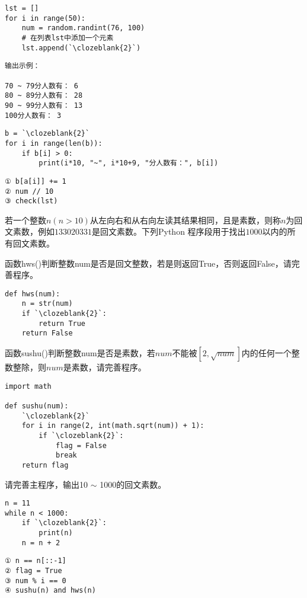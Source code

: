 \begin{groups}
\begin{questions}[rp]
\begin{subquestions}
\begin{paracol}{2}
\begin{lstlisting}
lst = []
for i in range(50):
    num = random.randint(76, 100)
    # 在列表lst中添加一个元素
    lst.append(`\clozeblank{2}`)  
\end{lstlisting}
\switchcolumn
\begin{lstlisting}[frame=single]
输出示例：

70 ~ 79分人数有： 6
80 ~ 89分人数有： 28
90 ~ 99分人数有： 13
100分人数有： 3
\end{lstlisting}
\end{paracol}
\begin{lstlisting}
b = `\clozeblank{2}`
for i in range(len(b)):
    if b[i] > 0:
        print(i*10, "~", i*10+9, "分人数有：", b[i])
\end{lstlisting}

\end{subquestions}


\begin{solution}
\begin{lstlisting}
① b[a[i]] += 1
② num // 10
③ check(lst)
\end{lstlisting}
\end{solution}



\setcounter{qnumber}{1}
\question 若一个整数$n(n>10)$从左向右和从右向左读其结果相同，且是素数，则称$n$为回文素数，例如$133020331$是回文素数。下列Python 程序段用于找出$1000$以内的所
有回文素数。
\begin{subquestions}
\subquestion 函数hws()判断整数num是否是回文整数，若是则返回True，否则返回False，请完善程序。
\begin{lstlisting}
def hws(num):
    n = str(num)
    if `\clozeblank{2}`:
        return True
    return False 
\end{lstlisting}

\subquestion 函数sushu()判断整数num是否是素数，若$num$不能被$[2, \sqrt{num}]$内的任何一个整数整除，则$num$是素数，请完善程序。
\begin{lstlisting}
import math

def sushu(num):
    `\clozeblank{2}`
    for i in range(2, int(math.sqrt(num)) + 1):
        if `\clozeblank{2}`:
            flag = False
            break
    return flag  
\end{lstlisting}

\subquestion 请完善主程序，输出10 $\sim$ 1000的回文素数。
\begin{lstlisting}
n = 11
while n < 1000:
    if `\clozeblank{2}`:
        print(n)
    n = n + 2
\end{lstlisting}
\end{subquestions}


\begin{solution}
\begin{lstlisting}
① n == n[::-1]
② flag = True
③ num % i == 0
④ sushu(n) and hws(n)
\end{lstlisting}
\end{solution}




\end{questions}
\end{groups}
